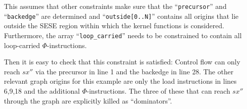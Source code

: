     \noindent
    This assumes that other constraints make sure that
    the ``\texttt{precursor}'' and ``\texttt{backedge}'' are determined and
    ``\texttt{outside[0..N]}'' contains
    all origins that lie outside the SESE region within which the kernel
    functions is considered.
    Furthermore, the array ``\texttt{loop\_carried}'' needs to be constrained to
    contain all loop-carried $\Phi$-instructions.

    Then it is easy to check that this constraint is satisfied:
    Control flow can only reach $sx''$ via the precursor in line 1 and the
    backedge in line 28.
    The other relevant graph origins for this example are only the load
    instructions in lines 6,9,18 and the additional $\Phi$-instructions.
    The three of these that can reach $sx''$ through the graph are explicitly
    killed as ``dominators''.

